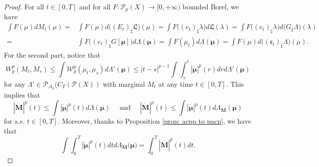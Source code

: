 \documentclass[10pt,leqno]{amsart}
\numberwithin{equation}{section}
\newcommand{\PP}{\mathcal{P}}
\begin{document}
\begin{proof}
    For all $t\in [0,T]$ and for all $F:\PP_p(X) \to [0,+\infty)$ bounded Borel, we have 
    \begin{align*}
        \int F(\mu) dM_t(\mu) 
        = & 
        \int F(\mu) d\big((E_t)_\sharp  \mathfrak{L}\big)(\mu)  
        =  
        \int F\big((e_t)_\sharp  \lambda \big) d\mathfrak{L}(\lambda) 
        =  
        \int F\big((e_t)_\sharp  \lambda \big) d\big(G_\sharp  \Lambda\big)(\lambda)
        \\
        = &
        \int F\big((e_t)_\sharp  G[\boldsymbol{\mu}] \big) d \Lambda(\boldsymbol{\mu}) 
        = 
        \int F(\mu_t) d \Lambda(\boldsymbol{\mu}) 
        = 
        \int F(\mu) d\big((\mathfrak{e}_t)_\sharp \Lambda\big)(\mu).
    \end{align*}
    For the second part, notice that 
    \[W_p^p(M_t,M_s) \leq \int \mathcal{W}_p^p(\mu_t,\mu_s) d\Lambda'(\boldsymbol{\mu}) \leq |t-s|^{p-1} \int \int_s^t |\dot{\boldsymbol{\mu}}|^p(r) dr d\Lambda'(\boldsymbol{\mu})\]
    for any $\Lambda' \in  \PP_{\mathcal{A}_p}\big(C_T(\PP(X)) $ with marginal $M_t$ at any time $t\in [0,T]$. This implies that 
    \[|\dot{\boldsymbol{M}}|^p(t) \leq \int |\dot{\boldsymbol{\mu}}|^p(t) d\Lambda(\boldsymbol{\mu}) \quad  \text{ and } \quad |\dot{\boldsymbol{M}}|^p(t) \leq \int |\dot{\boldsymbol{\mu}}|^p(t) d\Lambda_{\boldsymbol{M}}(\boldsymbol{\mu})\]
    for a.e. $t\in [0,T]$. Moreover, thanks to Proposition \ref{prop: acpp to pacp}, we have that 
    \[\int \int_0^T |\dot{\boldsymbol{\mu}}|^p(t) dt d\Lambda_{\boldsymbol{M}}(\boldsymbol{\mu)} = \int_0^T |\dot{\boldsymbol{M}}|^p(t) dt.\]
\end{proof}
\end{document}
